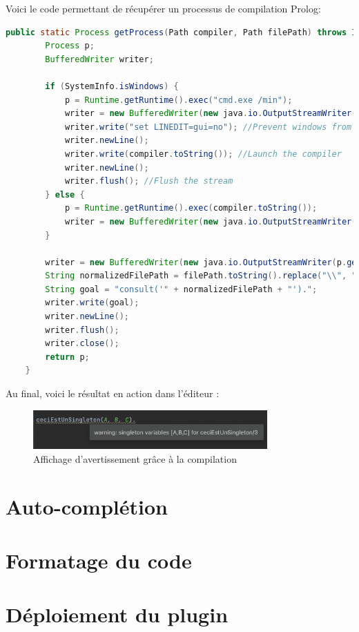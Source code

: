 \noindent Voici le code permettant de récupérer un processus de compilation Prolog:
\begin{lstlisting}[label={lst:get_prolog_process}, caption={Méthode de créer un processus de compilation Prolog}, language=java]
    public static Process getProcess(Path compiler, Path filePath) throws IOException, CantRunException {
        Process p;
        BufferedWriter writer;

        if (SystemInfo.isWindows) {
            p = Runtime.getRuntime().exec("cmd.exe /min");
            writer = new BufferedWriter(new java.io.OutputStreamWriter(p.getOutputStream()));
            writer.write("set LINEDIT=gui=no"); //Prevent windows from opening a console
            writer.newLine();
            writer.write(compiler.toString()); //Launch the compiler
            writer.newLine();
            writer.flush(); //Flush the stream
        } else {
            p = Runtime.getRuntime().exec(compiler.toString());
            writer = new BufferedWriter(new java.io.OutputStreamWriter(p.getOutputStream()));
        }

        writer = new BufferedWriter(new java.io.OutputStreamWriter(p.getOutputStream()));
        String normalizedFilePath = filePath.toString().replace("\\", "/"); //Mandatory for windows
        String goal = "consult('" + normalizedFilePath + "').";
        writer.write(goal);
        writer.newLine();
        writer.flush();
        writer.close();
        return p;
    }
\end{lstlisting}

\noindent Au final, voici le résultat en action dans l'éditeur :
\begin{figure}[h]
    \centering
    \includegraphics[width=0.8\textwidth]{images/background_compilation.png}
    \caption{Affichage d'avertissement grâce à la compilation}
    \label{fig:compilation_warnings}
\end{figure}

\section{Auto-complétion}


\section{Formatage du code}


\section{Déploiement du plugin}

